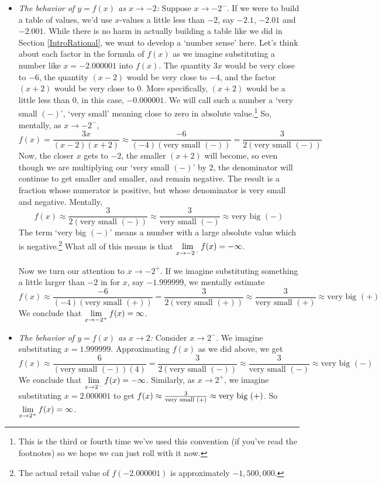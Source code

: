 \documentclass{ximera}
\begin{document}
\begin{ex}
\begin{enumerate}
\begin{itemize}
\item  \textit{The behavior of $y=f(x)$ as $x \rightarrow -2$:}  Suppose $x \rightarrow -2^{-}$.  If we were to build a table of values, we'd use $x$-values a little less than $-2$, say $-2.1$, $-2.01$ and $-2.001$.  While there is no harm in actually building a table like we did in Section \ref{IntroRational}, we want to develop a `number sense' here.  Let's think about each factor in the formula of $f(x)$ as we imagine substituting a number like $x=-2.000001$ into $f(x)$. The quantity $3x$ would be very close to $-6$, the quantity $(x-2)$ would be very close to $-4$, and the factor $(x+2)$ would be very close to $0$.  More specifically, $(x+2)$ would be a little less than $0$, in this case, $-0.000001.$  We will call such a number a `very small $(-)$', `very small' meaning close to zero in absolute value.\footnote{This is the third or fourth time we've used this convention (if you've read the footnotes) so we hope we can just roll with it now.}  So, mentally, as $x \rightarrow -2^{-}$, \[ f(x)   = \dfrac{3x}{(x-2)(x+2)} \approx \dfrac{-6}{(-4)\left( \text{very small $(-)$}\right)} = \dfrac{3}{2 \left( \text{very small $(-)$}\right)} \]  Now, the closer $x$ gets to $-2$, the smaller $(x+2)$ will become, so even though we are multiplying our `very small $(-)$' by $2$, the denominator will continue to get smaller and smaller, and remain negative.  The result is a fraction whose numerator is positive, but whose denominator is very small and negative.  Mentally, \[f(x) \approx \dfrac{3}{2 \left( \text{very small $(-)$}\right)} \approx \dfrac{3}{\text{very small $(-)$}} \approx \text{very big $(-)$}\]  The term `very big $(-)$' means a number with a large absolute value which is negative.\footnote{The actual retail value of $f(-2.000001)$ is approximately $-1,\!500,\!000$.}  What all of this means is that  $\ds{ \lim_{x \rightarrow -2^{-}} f(x) = -\infty}$.    

Now we turn our attention to $x \rightarrow -2^{+}$.  If we imagine substituting something a little larger than $-2$ in for $x$, say $-1.999999$, we mentally estimate \[ f(x) \approx \dfrac{-6}{(-4)\left( \text{very small $(+)$}\right)} = \dfrac{3}{2 \left( \text{very small $(+)$}\right)}  \approx \dfrac{3}{\text{very small $(+)$}} \approx \text{very big $(+)$}\]  We conclude that $\ds{ \lim_{x \rightarrow -2^{+}} f(x) = \infty}$.

\item  \textit{The behavior of $y=f(x)$ as $x \rightarrow 2$:} Consider $x \rightarrow 2^{-}$. We imagine substituting $x = 1.999999$.  Approximating $f(x)$ as we did above, we get \[ f(x) \approx \dfrac{6}{\left( \text{very small $(-)$}\right)(4)} = \dfrac{3}{2 \left( \text{very small $(-)$}\right)}  \approx \dfrac{3}{\text{very small $(-)$}} \approx \text{very big $(-)$}\]  We conclude that $\ds{ \lim_{x \rightarrow 2^{-}} f(x) = -\infty}$.  Similarly, as $x \rightarrow 2^{+}$, we imagine substituting $x = 2.000001$ to get $f(x) \approx \frac{3}{\text{\scriptsize very small $(+)$}} \approx \text{very big (+)}$.  So $\ds{ \lim_{x \rightarrow 2^{+}} f(x) = \infty}$.
\end{itemize}


\end{enumerate}
\end{ex}
\end{document}
